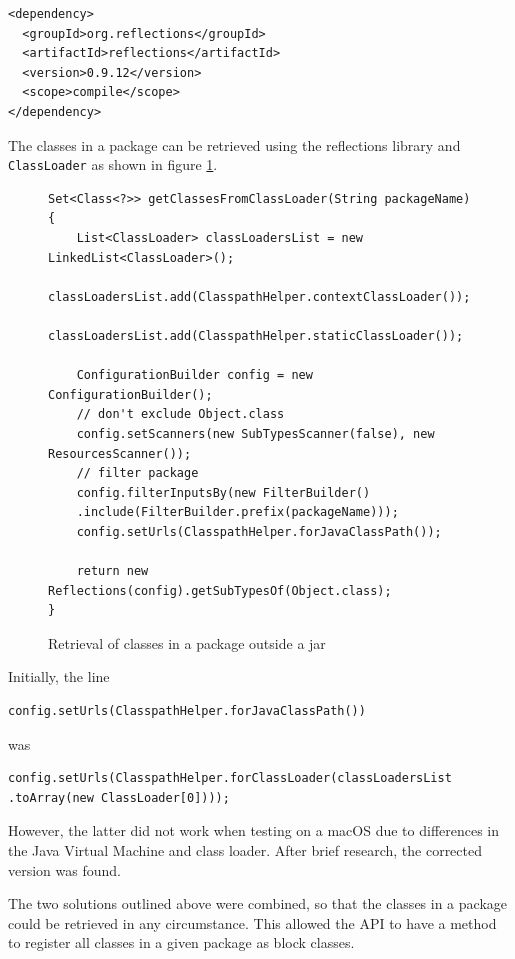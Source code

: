 \begin{verbatim}
<dependency>
  <groupId>org.reflections</groupId>
  <artifactId>reflections</artifactId>
  <version>0.9.12</version>
  <scope>compile</scope>
</dependency>
\end{verbatim}
The classes in a package can be retrieved using the reflections library and \texttt{ClassLoader} as shown in figure  \ref{fig:classes_in_package_outside_jar}.
\begin{figure}
\centering
\caption{Retrieval of classes in a package outside a jar}
\label{fig:classes_in_package_outside_jar}
\begin{verbatim}
Set<Class<?>> getClassesFromClassLoader(String packageName) {
    List<ClassLoader> classLoadersList = new LinkedList<ClassLoader>();
    classLoadersList.add(ClasspathHelper.contextClassLoader());
    classLoadersList.add(ClasspathHelper.staticClassLoader());

    ConfigurationBuilder config = new ConfigurationBuilder();
    // don't exclude Object.class
    config.setScanners(new SubTypesScanner(false), new ResourcesScanner());
    // filter package
    config.filterInputsBy(new FilterBuilder()
    .include(FilterBuilder.prefix(packageName)));
    config.setUrls(ClasspathHelper.forJavaClassPath());

    return new Reflections(config).getSubTypesOf(Object.class);
}
\end{verbatim}
\end{figure}
Initially, the line
\begin{verbatim}
config.setUrls(ClasspathHelper.forJavaClassPath())
\end{verbatim}
was
\begin{verbatim}
config.setUrls(ClasspathHelper.forClassLoader(classLoadersList
.toArray(new ClassLoader[0])));
\end{verbatim}
However, the latter did not work when testing on a macOS due to differences in the Java Virtual Machine and class loader. After brief research, the corrected version was found.\par
The two solutions outlined above were combined, so that the classes in a package could be retrieved in any circumstance. This allowed the API to have a method to register all classes in a given package as block classes.
